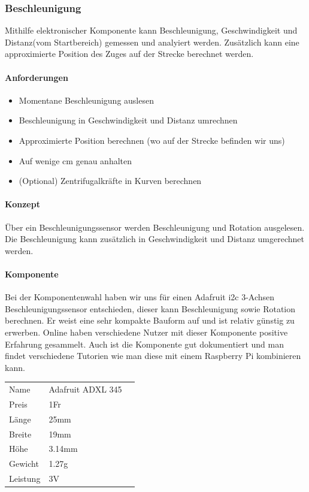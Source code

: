 \documentclass[../../main.tex]{subfiles}
\begin{document}
\subsubsection{Beschleunigung}
Mithilfe elektronischer Komponente kann Beschleunigung, Geschwindigkeit und Distanz(vom Startbereich) gemessen und analyiert werden. Zusätzlich kann eine approximierte Position des Zuges auf der Strecke berechnet werden.

\paragraph{Anforderungen}
\begin{itemize}
    \item Momentane Beschleunigung auslesen
    \item Beschleunigung in Geschwindigkeit und Distanz umrechnen
    \item Approximierte Position berechnen (wo auf der Strecke befinden wir uns)
    \item Auf wenige cm genau anhalten
    \item (Optional) Zentrifugalkräfte in Kurven berechnen
\end{itemize}

\paragraph{Konzept}
Über ein Beschleunigungssensor werden Beschleunigung und Rotation ausgelesen. Die Beschleunigung kann zusätzlich in Geschwindigkeit und Distanz umgerechnet werden.

\paragraph{Komponente}
Bei der Komponentenwahl haben wir uns für einen Adafruit i2c 3-Achsen Beschleunigungssensor entschieden, dieser kann Beschleunigung sowie Rotation berechnen. Er weist eine sehr kompakte Bauform auf und ist relativ günstig zu erwerben. Online haben verschiedene Nutzer mit dieser Komponente positive Erfahrung gesammelt. Auch ist die Komponente gut dokumentiert und man findet verschiedene Tutorien wie man diese mit einem Raspberry Pi kombinieren kann.

\begin{table}[] \centering
\begin{tabular}{lll}
Name & Adafruit ADXL 345 \\
Preis & 1Fr    \\
Länge & 25mm    \\
Breite & 19mm   \\
Höhe & 3.14mm      \\
Gewicht & 1.27g   \\
Leistung & 3V \\
\end{tabular}
\end{table}
\end{document}
